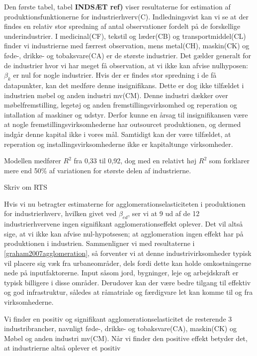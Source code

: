 \documentclass[a4paper, 12pt, titlepage]{article}
\begin{document}
Den første tabel, tabel \textbf{INDSÆT ref)} viser resultaterne for estimation af produktionsfunktionerne for industrierhverv(C). Indledningsvist kan vi se at der findes en relativ stor spredning af antal observationer fordelt på de forskellige underindustrier. I medicinal(CF), tekstil og læder(CB) og transportmiddel(CL) finder vi industrierne med færrest observation, mens metal(CH), maskin(CK) og føde-, drikke- og tobaksvare(CA) er de største industrier. Det gælder generalt for de industrier hvor vi har meget få observation, at vi ikke kan afvise nulhyposen: $\beta_k$ er nul for nogle industrier. Hvis der er findes stor spredning i de få datapunkter, kan det medføre denne insignifikans. 
Dette er dog ikke tilfældet i industrien møbel og anden industri mv(CM). Denne industri dækker over møbelfremstilling, legetøj og anden fremstillingsvirksomhed og reperation og intallation af maskiner og udstyr. Derfor kunne en årsag til insignifikansen være at nogle fremstillingsvirksomhederne har outsourcet produktionen, og dermed indgår denne kapital ikke i vores mål. Samtidigt kan der være tilfældet, at reperation og installingsvirksomhederne ikke er kapitaltunge virksomheder.

Modellen medfører $R^2$ fra 0,33 til 0,92, dog med en relativt høj $R^2$ som forklarer mere end 50\% af variationen for største delen af industrierne. 


Skriv om RTS


Hvis vi nu betragter estimaterne for agglomerationselasticiteten i produktionen for industrierhverv, hvilken givet ved $\beta_{ed}$, ser vi at 9 ud af de 12 industrierhvervene ingen signifikant agglomerationseffekt oplever. Det vil altså sige, at vi ikke kan afvise nul-hypotsesen; at agglomeration ingen effekt har på produktionen i industrien. Sammenligner vi med resultaterne i \ref{graham2007agglomeration}, så forventer vi at denne industrivirksomheder typisk vil placere sig væk fra urbaneområder, dels fordi dette kan holde omkostningerne nede på inputfaktorerne. Input såsom jord, bygninger, leje og arbejdskraft er typisk billigere i disse områder. Derudover kan der være bedre tilgang til effektiv og god infrastruktur, således at råmatriale og færdigvare let kan komme til og fra virksomhederne.      

Vi finder en positiv og signifikant agglomerationselasticitet de resterende 3 industribrancher, navnligt føde-, drikke- og tobaksvare(CA), maskin(CK) og Møbel og anden industri mv(CM). Når vi finder den positive effekt betyder det, at industrierne altså oplever et positiv 
\end{document}
